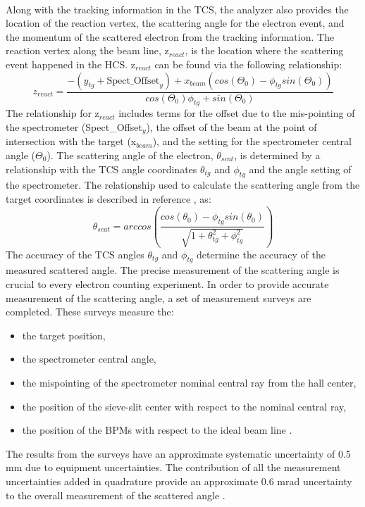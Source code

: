 \paragraph{}Along with the tracking information in the TCS, the analyzer also provides the location of the reaction vertex, the scattering angle for the electron event, and the momentum of the scattered electron from the tracking information. The reaction vertex along the beam line, z$_{react}$, is the location where the scattering event happened in the HCS. z$_{react}$ can be found via the following relationship:
\begin{equation}
z_{react} = \frac{-(y_{tg} + \text{Spect\_Offset}_y) + x_{beam}(cos(\Theta_0) - \phi_{tg}sin(\Theta_0))} {cos(\Theta_0)\phi_{tg} + sin(\Theta_0)}
\end{equation}
The relationship for z$_{react}$ includes terms for the offset due to the mis-pointing of the spectrometer (Spect\_Offset$_y$), the offset of the beam at the point of intersection with the target (x$_{beam}$), and the setting for the spectrometer central angle ($\Theta_0$). The scattering angle of the electron, $\theta_{scat}$, is determined by a relationship with the TCS angle coordinates $\theta_{tg}$ and $\phi_{tg}$ and the angle setting of the spectrometer. The relationship used to calculate the scattering angle from the target coordinates is described in reference \cite{HallA}, as:
\begin{equation}
\theta_{scat} = arccos \left( \frac{cos(\theta_{0})- \phi_{tg}sin(\theta_{0})} {\sqrt{1 + \theta_{tg}^2 + \phi_{tg}^2}} \right) \label{scatangle}
\end{equation}
The accuracy of the TCS angles $\theta_{tg}$ and $\phi_{tg}$ determine the accuracy of the measured scattered angle. The precise measurement of the scattering angle is crucial to every electron counting experiment. In order to provide accurate measurement of the scattering angle, a set of measurement surveys are completed. These surveys measure the:
\begin{itemize}
	\item the target position,
	\item the spectrometer central angle,
	\item the mispointing of the spectrometer nominal central ray from the hall center,
	\item the position of the sieve-slit center with respect to the nominal central ray,
	\item the position of the BPMs with respect to the ideal beam line \cite{HallA}.
\end{itemize} 
The results from the surveys have an approximate systematic uncertainty of 0.5 mm due to equipment uncertainties. The contribution of all the measurement uncertainties added in quadrature provide an approximate 0.6 mrad uncertainty to the overall measurement of the scattered angle \cite{HallA}. 
